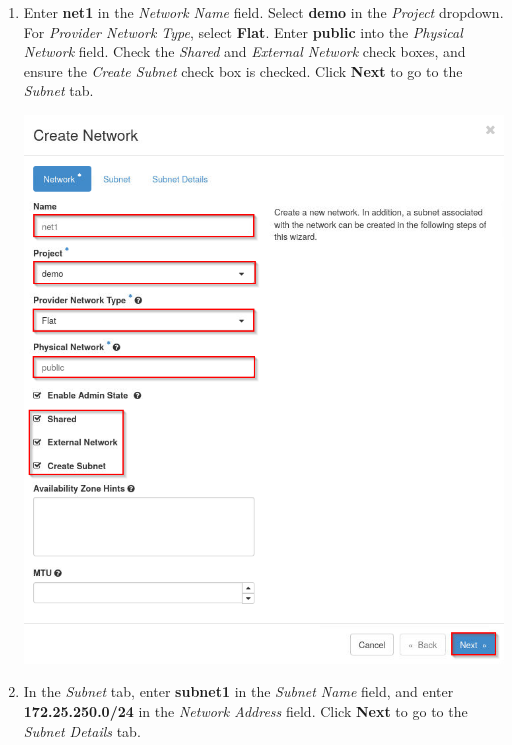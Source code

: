 \documentclass[letterpaper, 12pt]{article}
\begin{document}
\begin{enumerate}
    \item Enter \textbf{net1} in the \textit{Network Name} field. Select \textbf{demo} in the \textit{Project} dropdown.
    For \textit{Provider Network Type}, select \textbf{Flat}. Enter \textbf{public} into the \textit{Physical Network}
    field. Check the \textit{Shared} and \textit{External Network} check boxes, and ensure the \textit{Create Subnet}
    check box is checked. Click \textbf{Next} to go to the \textit{Subnet} tab.

    \begin{center}
        \includegraphics[width=\linewidth]{images/part1/step7.png}
    \end{center}

    \item In the \textit{Subnet} tab, enter \textbf{subnet1} in the \textit{Subnet Name} field, and enter
    \textbf{172.25.250.0/24} in the \textit{Network Address} field. Click \textbf{Next} to go to the \textit{Subnet
    Details} tab.


\end{enumerate}
\end{document}
